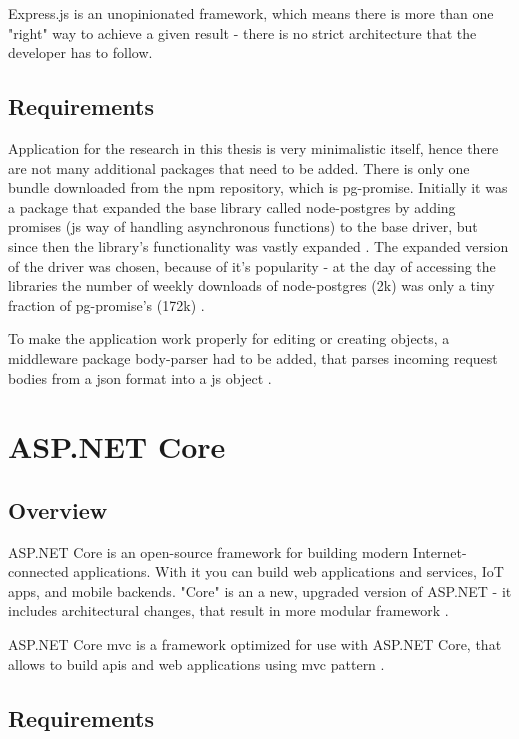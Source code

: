 Express.js is an unopinionated framework, which means there is more than one "right" way to achieve a given result - there is no strict architecture that the developer has to follow.

\subsection{Requirements}
Application for the research in this thesis is very minimalistic itself, hence there are not many additional packages that need to be added. There is only one bundle downloaded from the \acrshort{npm} repository, which is pg-promise. Initially it was a package that expanded the base library called node-postgres by adding promises (\acrlong{js} way of handling asynchronous functions) to the base driver, but since then the library's functionality was vastly expanded \cite{pgPromiseGit}.
The expanded version of the driver was chosen, because of it's popularity - at the day of accessing the libraries the number of weekly downloads of node-postgres (2k) \cite{nodePostgresNpm} was only a tiny fraction of pg-promise's (172k) \cite{pgPromiseNpm}.

To make the application work properly for editing or creating objects, a middleware package body-parser had to be added, that parses incoming request bodies from a \acrshort{json} format into a \acrshort{js} object \cite{bodyParser}.

\section{ASP.NET Core}

\subsection{Overview}
ASP.NET Core is an open-source framework for building modern Internet-connected applications. With it you can build web applications and services, IoT apps, and mobile backends. "Core" is an a new, upgraded version of ASP.NET - it includes architectural changes, that result in more modular framework \cite{aspnetIntroduction}.

ASP.NET Core \acrshort{mvc} is a framework optimized for use with ASP.NET Core, that allows to build \acrshort{api}s and web applications using \acrlong{mvc} pattern \cite{aspnetMvcOverview}.

\subsection{Requirements}

